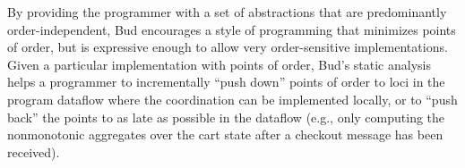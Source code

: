By providing the programmer with a set of abstractions that are predominantly 
order-independent, Bud encourages a style of programming that minimizes points 
of order, but is expressive enough to allow very order-sensitive implementations. 
Given a particular implementation with points of order, Bud's 
static analysis helps a programmer to incrementally ``push down'' points of order
to loci in the program dataflow where the coordination can be implemented locally, or to 
``push back'' the points to as late as possible in the dataflow (e.g., only computing the
nonmonotonic aggregates over the cart state after a checkout message has been received).


